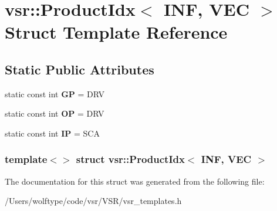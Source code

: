 \hypertarget{structvsr_1_1_product_idx_3_01_i_n_f_00_01_v_e_c_01_4}{\section{vsr\-:\-:Product\-Idx$<$ I\-N\-F, V\-E\-C $>$ Struct Template Reference}
\label{structvsr_1_1_product_idx_3_01_i_n_f_00_01_v_e_c_01_4}
}
\subsection*{Static Public Attributes}
\begin{DoxyCompactItemize}
\item 
\hypertarget{structvsr_1_1_product_idx_3_01_i_n_f_00_01_v_e_c_01_4_a935d9090a6c95e38c77d66adc715da59}{static const int {\bfseries G\-P} = D\-R\-V}\label{structvsr_1_1_product_idx_3_01_i_n_f_00_01_v_e_c_01_4_a935d9090a6c95e38c77d66adc715da59}

\item 
\hypertarget{structvsr_1_1_product_idx_3_01_i_n_f_00_01_v_e_c_01_4_ae584e78de60521f0b6182afc22425798}{static const int {\bfseries O\-P} = D\-R\-V}\label{structvsr_1_1_product_idx_3_01_i_n_f_00_01_v_e_c_01_4_ae584e78de60521f0b6182afc22425798}

\item 
\hypertarget{structvsr_1_1_product_idx_3_01_i_n_f_00_01_v_e_c_01_4_ab358e9d4bda6fc969e3f7d33d3b6bd90}{static const int {\bfseries I\-P} = S\-C\-A}\label{structvsr_1_1_product_idx_3_01_i_n_f_00_01_v_e_c_01_4_ab358e9d4bda6fc969e3f7d33d3b6bd90}

\end{DoxyCompactItemize}
\subsubsection*{template$<$$>$ struct vsr\-::\-Product\-Idx$<$ I\-N\-F, V\-E\-C $>$}



The documentation for this struct was generated from the following file\-:\begin{DoxyCompactItemize}
\item 
/\-Users/wolftype/code/vsr/\-V\-S\-R/vsr\-\_\-templates.\-h\end{DoxyCompactItemize}

